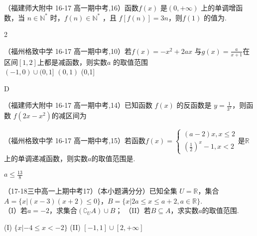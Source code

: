 \item
（福建师大附中 16-17 高一期中考,16）函数$f(x)$ 是$(0,+\infty)$ 上的单调增函数，当 $n\in \mathbb{N}^*$ 时，$f(n)\in\mathbb{N}^*$ ，且 $f[f(n) ] =3n$，则$f(1)$ 的值为\tk.\\
\begin{answer}2\end{answer}


\item
（福州格致中学 16-17 高一期中考,10）若$f(x)=-x^2+2ax $
 与$g(x)=\frac a{x+1} $在区间$[1,2] $上都是减函数，则实数$a $ 的取值范围\xz\\
 		{$(-1,0)\cup (0,1]$}
        {$(0,1) $}
        {(0,1]}
 \begin{answer}      D\end{answer}

\item
（福建师大附中 16-17 高一期中考,14）已知函数 $f(x)$ 的反函数是 $y=\frac{1}{3^x}$，则函数 $f(2x-x^2) $的减区间为\tk

\item
（福州格致中学 16-17 高一期中考,15）若函数$f(x)=\begin{cases}(a-2)x,x\leq2\\(\frac{1}{2})^x-1,x<2\end{cases}$是$\mathbb{R}$上的单调递减函数，则实数$a$的取值范围是\tk.
\begin{answer}
$a\leq\frac{13}{8}$
\end{answer}

\item
（17-18三中高一上期中考17）（本小题满分分）已知全集 $U=\mathbb{R}$，集合$A=\{x|(x-3)(x+2)\leq0\} $，$B=\{x|2a\leq x\leq a+2,a\in \mathbb{R} \} $.\\
（I）若$a=-2 $，求集合$(\complement_UA)\cup B $；
（II）若$B\subseteq A $，求实数$a $的取值范围.
\begin{answer}
 (I) $\{x|-4\leq x<-2 \} $
 (II) $[-1,1]\cup[2,+\infty] $
\end{answer}

